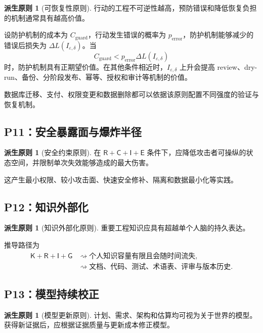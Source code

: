 \documentclass[11pt,a4paper]{ctexart}
\numberwithin{equation}{section}
\theoremstyle{definition}
\newtheorem{principle}[definition]{派生原则}
\theoremstyle{plain}
\newcommand{\Know}{\mathsf{K}}
\newcommand{\Res}{\mathsf{R}}
\newcommand{\Ctrl}{\mathsf{C}}
\newcommand{\Info}{\mathsf{I}}
\newcommand{\Goal}{\mathsf{G}}
\newcommand{\Eth}{\mathsf{E}}
\begin{document}
\begin{principle}[可恢复性原则]
行动的工程不可逆性越高，预防错误和降低恢复负担的机制通常具有越高价值。
\end{principle}

设防护机制的成本为 $C_{\mathrm{guard}}$，行动发生错误的概率为 $p_{\mathrm{error}}$，防护机制能够减少的错误后损失为 $\Delta L(I_{\varepsilon,\delta})$。当
\[
C_{\mathrm{guard}}
<
p_{\mathrm{error}}
\Delta L(I_{\varepsilon,\delta})
\]
时，防护机制具有正期望价值。在其他条件相近时，$I_{\varepsilon,\delta}$ 上升会提高 review、dry-run、备份、分阶段发布、幂等、授权和审计等机制的价值。

数据库迁移、支付、权限变更和数据删除都可以依据该原则配置不同强度的验证与恢复机制。

\subsection{P11：安全暴露面与爆炸半径}

\begin{principle}[安全约束原则]
在 $\Res+\Ctrl+\Info+\Eth$ 条件下，应降低攻击者可操纵的状态空间，并限制单次失效能够造成的最大伤害。
\end{principle}

这产生最小权限、较小攻击面、快速安全修补、隔离和数据最小化等实践。

\subsection{P12：知识外部化}

\begin{principle}[知识外部化原则]
重要工程知识应具有超越单个人脑的持久表达。
\end{principle}

推导路径为
\[
\begin{aligned}
\Know+\Res+\Info+\Goal
&\rightsquigarrow
\text{个人知识容量有限且会随时间流失},\\
&\rightsquigarrow
\text{文档、代码、测试、术语表、评审与版本历史}.
\end{aligned}
\]

\subsection{P13：模型持续校正}

\begin{principle}[模型更新原则]
计划、需求、架构和估算均可视为关于世界的模型。获得新证据后，应根据证据质量与更新成本修正模型。
\end{principle}
\end{document}

